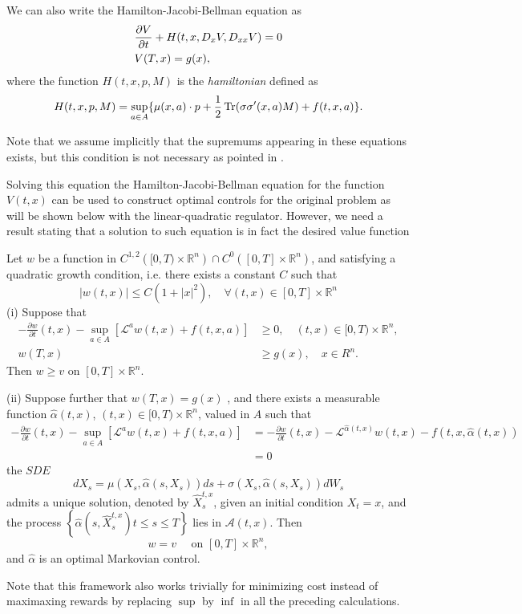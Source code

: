 We can also write the Hamilton-Jacobi-Bellman equation as 
\begin{equation}
		\begin{split}
		&\frac{\partial V}{\partial t}+H(t,x,D_x V,D_{xx} V)=0\\
		&V(T,x)=g(x),
	\end{split}
\end{equation}
where the function $H(t,x,p,M)$ is the \textit{hamiltonian} defined as
\begin{equation}
	H(t,x,p,M)=\sup_{a\in A}\{\mu(x,a)\cdot p+\frac{1}{2}\operatorname{Tr} (\sigma\sigma'(x,a)M)+f(t,x,a)\}.
\end{equation}

Note that we assume implicitly that the supremums appearing in these equations exists, but this condition is not necessary as pointed in \cite{pham_continuous-time_2009}.

Solving this equation the Hamilton-Jacobi-Bellman equation for the function $V(t,x)$ can be used to construct optimal controls for the original problem as will be shown below with the linear-quadratic regulator. However, we need a result stating that a solution to such equation is in fact the desired value function
\begin{thm}
	Let $w$ be a function in $C^{1,2}\left([0, T) \times \mathbb{R}^n\right) \cap C^0\left([0, T] \times \mathbb{R}^n\right)$, and satisfying a quadratic growth condition, i.e. there exists a constant $C$ such that
	$$
	|w(t, x)| \leq C\left(1+|x|^2\right), \quad \forall(t, x) \in[0, T] \times \mathbb{R}^n
	$$
	(i) Suppose that
	$$
	\begin{aligned}
		-\frac{\partial w}{\partial t}(t, x)-\sup _{a \in A}\left[\mathcal{L}^a w(t, x)+f(t, x, a)\right] & \geq 0, \quad(t, x) \in[0, T) \times \mathbb{R}^n, \\
		w(T, x) & \geq g(x), \quad x \in R^n .
	\end{aligned}
	$$
	Then $w \geq v$ on $[0, T] \times \mathbb{R}^n$.
	
	(ii) Suppose further that $w(T,x)=g(x)$ , and there exists a measurable function $\hat{\alpha}(t, x)$, $(t, x) \in[0, T) \times \mathbb{R}^n$, valued in $A$ such that
	$$
	\begin{aligned}
		-\frac{\partial w}{\partial t}(t, x)-\sup _{a \in A}\left[\mathcal{L}^a w(t, x)+f(t, x, a)\right] & =-\frac{\partial w}{\partial t}(t, x)-\mathcal{L}^{\hat{\alpha}(t, x)} w(t, x)-f(t, x, \hat{\alpha}(t, x)) \\
		& =0
	\end{aligned}
	$$
	the $S D E$
	$$
	d X_s=\mu\left(X_s, \hat{\alpha}\left(s, X_s\right)\right) d s+\sigma\left(X_s, \hat{\alpha}\left(s, X_s\right)\right) d W_s
	$$
	admits a unique solution, denoted by $\hat{X}_s^{t, x}$, given an initial condition $X_t=x$, and the process $\left\{\hat{\alpha}\left(s, \hat{X}_s^{t, x}\right) t \leq s \leq T\right\}$ lies in $\mathcal{A}(t, x)$. Then
	$$
	w=v \quad \text { on }[0, T] \times \mathbb{R}^n,
	$$
	and $\hat{\alpha}$ is an optimal Markovian control.
\end{thm}
Note that this framework also works trivially for minimizing cost instead of maximaxing rewards by replacing $\sup$ by $\inf$ in all the preceding calculations.
